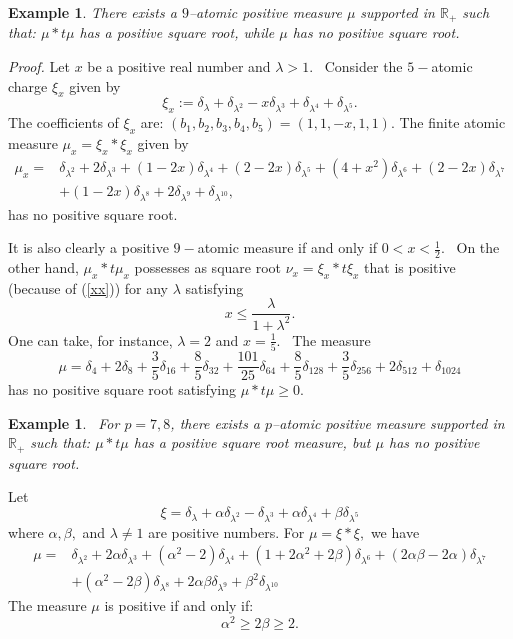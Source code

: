 \documentclass[12pt]{amsart}
\newtheorem{ex}[thm]{Example}
\begin{document}
\begin{ex} \label{ex51} There exists a $9$--atomic positive measure $\mu$ supported in $\mathbb R_+$ such that: $\mu*t\mu$ has a  positive square root, while $\mu$ has no positive square root.  
\end{ex}
{\it Proof.} Let $x$ be a positive real number and $\lambda > 1$. \ 
Consider the $5-$atomic charge $\xi_x$ given by 
$$\xi_x := \delta_{\lambda}+\delta_{\lambda^{2}}-x\delta_{\lambda^{3}}+\delta_{\lambda^{4}}+\delta_{\lambda^{5}}.$$
The coefficients of $\xi_x$ are: $(b_1,b_2,b_3,b_4,b_5)=(1,1,-x,1,1)$.
The finite atomic measure $\mu_x=\xi_x*\xi_x$ given by
$$\begin{array}{ll}
   \mu_x =   & \delta_{\lambda^{2}} + 2\delta_{\lambda^{3}} + (1-2x)\delta_{\lambda^{4}} + (2-2x)\delta_{\lambda^{5}} + (4+x^2)\delta_{\lambda^{6}}  + (2-2x)\delta_{\lambda^{7}}\\
     &  + (1-2x)\delta_{\lambda^{8}} + 2\delta_{\lambda^{9}}+\delta_{\lambda^{10}}, 
\end{array}
$$
has no positive  square root.

It is also clearly a positive $9-$atomic measure if and only if $0<x < \frac{1}{2}$. \ 
On the other hand, $\mu_x*t\mu_x$ possesses  as square root $\nu_x=\xi_x*t\xi_x$ that is positive (because of (\ref{xx})) for any $\lambda$ satisfying 
$$
x\le  \frac{\lambda}{1+\lambda^2}.
$$ 
One can take, for instance, $\lambda = 2$ and $x=\frac{1}{5}$. \ The measure
$$   \mu= \delta_{4} + 2\delta_{8} + \frac{3}{5}\delta_{16} + \frac{8}{5}\delta_{32} + \frac{101}{25}\delta_{64} + \frac{8}{5}\delta_{128} + \frac{3}{5}\delta_{256} + 2\delta_{512}+\delta_{1024} $$
has no positive square root satisfying $\mu*t\mu \ge 0.$

\begin{ex} \label{ex52} \ For $p=7,8$, there exists a $p$--atomic positive measure supported in $\mathbb R_+$ such that: $\mu*t\mu$ has a positive square root measure, but $\mu$ has no positive square root.  
\end{ex}
Let $$\xi=\delta_{\lambda} + \alpha\delta_{\lambda^2} - \delta_{\lambda^3} + \alpha \delta_{\lambda^4} + \beta \delta_{\lambda^5}$$
where $\alpha, \beta,$ and $  \lambda\ne 1$  are positive numbers. For  $\mu=\xi*\xi, $
we have 
$$\begin{array}{ll}
  \mu =    &  \delta_{\lambda^2} + 2\alpha \delta_{\lambda^3} + (\alpha^2-2)\delta_{\lambda^4} + (1 + 2\alpha^2+2\beta)\delta_{\lambda^6} 
    + (2\alpha\beta-2\alpha )\delta_{\lambda^7} \\
     & + (\alpha^2 -2\beta )\delta_{\lambda^8} + 2\alpha\beta \delta_{\lambda^9} + \beta^2\delta_{\lambda^{10}}
\end{array}  
$$
The measure $\mu$ is positive if and only if: $$ \alpha^2\geq 2\beta \geq 2.$$
\end{document}
